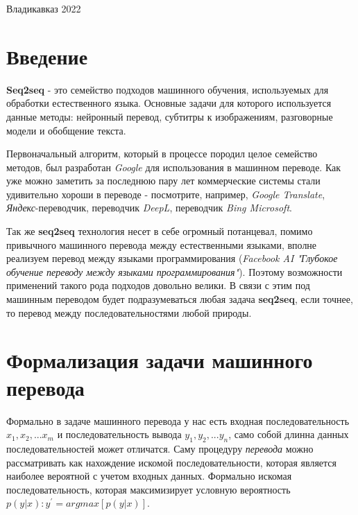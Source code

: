 \documentclass[a4paper,14pt]{article}
\begin{document}
	\normalsize{ \hspace{28pt}} \hfill \break
	\begin{center} Владикавказ 2022 \end{center}
	
	\thispagestyle{empty}
	\tableofcontents
	\thispagestyle{empty}
	\clearpage
	\newtheorem{theorem}{Теорема}
	
	\section{Введение}
	
	\textbf{Seq2seq} - это семейство подходов машинного обучения, используемых для обработки естественного языка. Основные задачи для которого используется данные методы: нейронный перевод, субтитры к изображениям, разговорные модели и обобщение текста.
	
	Первоначальный алгоритм, который в процессе породил целое семейство методов, был разработан \textit{Google} для использования в машинном переводе. Как уже можно заметить за последнюю пару лет коммерческие системы стали удивительно хороши в  переводе - посмотрите, например, \textit{Google Translate}, \textit{Яндекс}-переводчик, переводчик \textit{DeepL}, переводчик \textit{Bing Microsoft}.
	
	Так же \textbf{seq2seq} технология несет в себе огромный потанцевал, помимо привычного машинного перевода между естественными языками, вполне реализуем перевод между языками программирования (\textit{Facebook AI "Глубокое обучение переводу между языками программирования"}). Поэтому возможности применений такого рода подходов довольно велики. В связи с этим под машинным переводом будет подразумеваться любая задача \textbf{seq2seq}, если точнее, то перевод между последовательностями любой природы.
	
	\clearpage
	
	\section{Формализация задачи машинного перевода}
	Формально в задаче машинного перевода у нас есть входная последовательность $x_{1}, x_{2}, ... x_{m}$ и последовательность вывода $y_{1}, y_{2}, ... y_{n}$, само собой длинна данных последовательностей может отличатся. Саму процедуру \textit{перевода} можно рассматривать как нахождение искомой последовательности, которая является наиболее вероятной с учетом входных данных. Формально искомая последовательность, которая максимизирует условную вероятность $p(y|x): y^{'} = argmax[p(y|x)]$.
	
\end{document}
